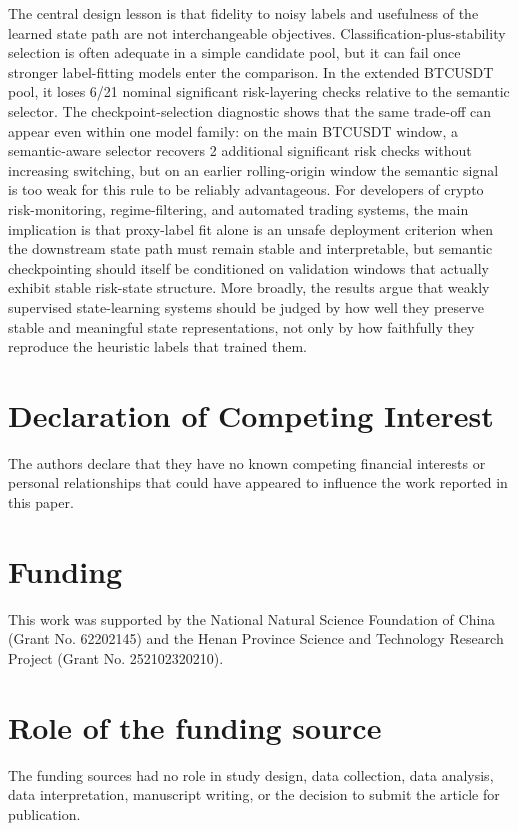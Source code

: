 \documentclass[a4paper,fleqn]{cas-dc}
\begin{document}
The central design lesson is that fidelity to noisy labels and usefulness of the learned state path are not interchangeable objectives. Classification-plus-stability selection is often adequate in a simple candidate pool, but it can fail once stronger label-fitting models enter the comparison. In the extended BTCUSDT pool, it loses 6/21 nominal significant risk-layering checks relative to the semantic selector. The checkpoint-selection diagnostic shows that the same trade-off can appear even within one model family: on the main BTCUSDT window, a semantic-aware selector recovers 2 additional significant risk checks without increasing switching, but on an earlier rolling-origin window the semantic signal is too weak for this rule to be reliably advantageous. For developers of crypto risk-monitoring, regime-filtering, and automated trading systems, the main implication is that proxy-label fit alone is an unsafe deployment criterion when the downstream state path must remain stable and interpretable, but semantic checkpointing should itself be conditioned on validation windows that actually exhibit stable risk-state structure. More broadly, the results argue that weakly supervised state-learning systems should be judged by how well they preserve stable and meaningful state representations, not only by how faithfully they reproduce the heuristic labels that trained them.

\clearpage
\printcredits

\section*{Declaration of Competing Interest}
The authors declare that they have no known competing financial interests or personal relationships that could have appeared to influence the work reported in this paper.

\section*{Funding}
This work was supported by the National Natural Science Foundation of China
(Grant No. 62202145) and the Henan Province Science and Technology Research
Project (Grant No. 252102320210).

\section*{Role of the funding source}
The funding sources had no role in study design, data collection, data
analysis, data interpretation, manuscript writing, or the decision to submit
the article for publication.
\end{document}
